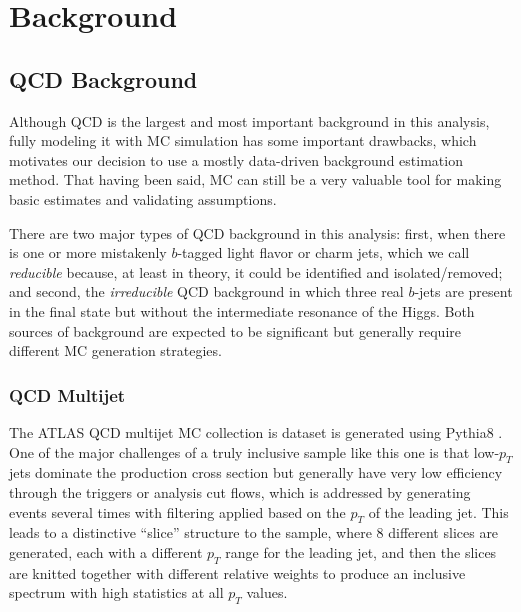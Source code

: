 \section{Background}
\subsection{QCD Background}
Although QCD is the largest and most important background in this analysis, fully modeling 
it with MC simulation has some important drawbacks, which motivates our decision to use a 
mostly data-driven background estimation method.  That having been said, MC can 
still be a very valuable tool for making basic estimates and validating assumptions. 

There are two major types of QCD background in this analysis: first, when 
there is one or more mistakenly $b$-tagged light flavor or charm jets, 
which we call \textit{reducible} because, at least in theory, 
it could be identified and isolated/removed; and second, the \textit{irreducible} 
QCD background in which three real $b$-jets are present in the final 
state but without the intermediate resonance of the Higgs.  Both sources of background are 
expected to be significant but generally require different MC generation strategies.



\subsubsection{QCD Multijet}
The ATLAS QCD multijet MC collection is dataset is generated using Pythia8 \cite{Pythia8}.  
One of the major challenges of a truly inclusive sample like this one is that 
low-$p_T$ jets dominate the production cross section but generally have 
very low efficiency through the triggers or analysis cut flows, which is addressed by 
generating events several times with filtering applied based on the $p_T$ 
of the leading jet.  This leads to a distinctive ``slice'' structure to 
the sample, where 8 different slices are generated, each with a different $p_T$ 
range for the leading jet, and then the slices are knitted together with different 
relative weights to produce an inclusive spectrum with high statistics at all $p_T$ values.  

